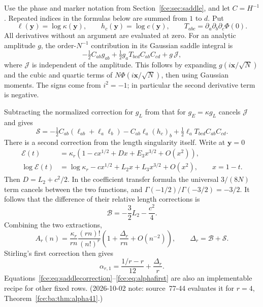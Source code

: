 \documentclass[11pt,a4paper]{article}
\numberwithin{equation}{section}
\theoremstyle{definition}\newtheorem{definition}[theorem]{Definition}
\theoremstyle{remark}\newtheorem{remark}[theorem]{Remark}
\newcommand{\E}{\mathcal E}
\begin{document}
Use the phase and marker notation from Section~\ref{fce:sec:saddle}, and let
$C=H^{-1}$. Repeated indices in the formulas below are summed from $1$ to
$d$. Put
\[
 \ell(\boldsymbol y)=\log\kappa(\boldsymbol y),\qquad
 h_c(\boldsymbol y)=\log c(\boldsymbol y),\qquad
 T_{abc}=\partial_a\partial_b\partial_c\Phi(0).
\]
All derivatives without an argument are evaluated at zero.
For an analytic amplitude $g$, the order-$N^{-1}$ contribution in its
Gaussian saddle integral is
\[
 -\tfrac12 C_{ab}g_{ab}
 +\tfrac12 g_aT_{bcd}C_{ab}C_{cd}
 +g\,\mathcal J,
\]
where $\mathcal J$ is independent of the amplitude. This follows by expanding
$g(i\boldsymbol x/\sqrt N)$ and the cubic and quartic terms of
$N\Phi(i\boldsymbol x/\sqrt N)$, then using Gaussian moments. The signs
come from $i^2=-1$; in particular the second derivative term is negative.

Subtracting the normalized correction for $g_L$ from that for
$g_E=\kappa g_L$ cancels $\mathcal J$ and gives
\begin{equation}\label{fce:eq:saddlecorrection}
 \mathcal S=-\tfrac12 C_{ab}(\ell_{ab}+\ell_a\ell_b)
             -C_{ab}\ell_a(h_c)_b
             +\tfrac12\ell_aT_{bcd}C_{ab}C_{cd}.
\end{equation}
There is a second correction from the length singularity itself. Write
at $\boldsymbol y=0$
\begin{align*}
 \E(t)&=\kappa_r(1-cx^{1/2}+D x+E_3x^{3/2}+O(x^2)),\\
 \log\E(t)&=\log\kappa_r-cx^{1/2}+L_2x+L_3x^{3/2}+O(x^2),
 \qquad x=1-t.
\end{align*}
Then $D=L_2+c^2/2$. In the coefficient transfer formula the universal
$3/(8N)$ term cancels between the two functions, and
$\Gamma(-1/2)/\Gamma(-3/2)=-3/2$. It follows that the difference of their
relative length corrections is
\begin{equation}\label{fce:eq:lengthcorrection}
 \mathcal B=-\frac32L_2-\frac{c^2}{4}.
\end{equation}
Combining the two extractions,
\begin{equation}\label{fce:eq:ratiofirst}
 A_r(n)=\frac{\kappa_r}{rn}\frac{(rn)!}{(n!)^r}
 \left(1+\frac{\Delta_r}{rn}+O(n^{-2})\right),
 \qquad \Delta_r=\mathcal B+\mathcal S.
\end{equation}
Stirling's first correction then gives
\begin{equation}\label{fce:eq:alphafirst}
 \alpha_{r,1}=\frac{1/r-r}{12}+\frac{\Delta_r}{r}.
\end{equation}
Equations~\eqref{fce:eq:saddlecorrection}--\eqref{fce:eq:alphafirst} are also an
implementable recipe for other fixed rows. (2026-10-02 note: source~77-44
evaluates it for $r=4$, Theorem~\ref{fce:ba:thm:alpha41}.)
\end{document}
